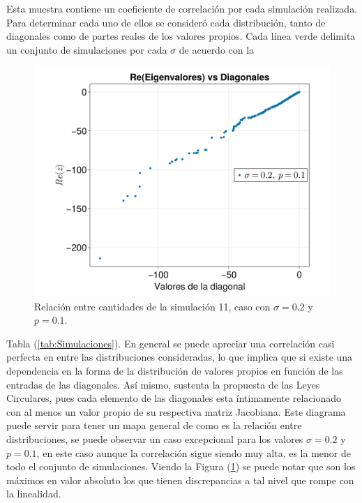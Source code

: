 Esta muestra contiene un coeficiente de correlación por cada simulación realizada. Para determinar cada uno de ellos se consideró cada distribución, tanto de diagonales como de partes reales de los valores propios. Cada línea verde delimita un conjunto de simulaciones por cada $\sigma$ de acuerdo con la 
\begin{figure} \vspace{-30pt} \begin{center}
		\includegraphics[scale=0.135]{../Imagenes/AnomaliaSim11}
	\end{center}
	\vspace{-20pt} 
	\caption{Relación entre cantidades de la simulación 11, caso con $\sigma=0.2$ y $p=0.1$.}
	\vspace{-10pt}
	\label{fig:AnomaliaSim11}
\end{figure}
Tabla (\ref{tab:Simulaciones}). En general se puede apreciar una correlación casi perfecta en entre las distribuciones consideradas, lo que implica que si existe una dependencia en la forma de la distribución de valores propios en función de las entradas de las diagonales. Así mismo, sustenta la propuesta de las Leyes Circulares, pues cada elemento de las diagonales esta íntimamente relacionado con al menos un valor propio de su respectiva matriz Jacobiana. Este diagrama puede servir para tener un mapa general de como es la relación entre distribuciones, se puede observar un caso excepcional para los valores $\sigma=0.2$ y $p=0.1$, en este caso aunque la correlación sigue siendo muy alta, es la menor de todo el conjunto de simulaciones. Viendo la Figura (\ref{fig:AnomaliaSim11}) se puede notar que son los máximos en valor absoluto los que tienen discrepancias a tal nivel que rompe con la linealidad.

